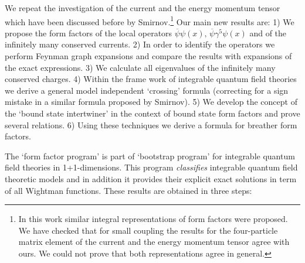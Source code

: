 \documentclass[a4paper,a4paper]{article}
\begin{document}
We repeat the investigation of the current and the energy momentum tensor
which have been discussed before by Smirnov\cite{Sm}.\footnote{%
In this work similar integral representations of form factors were proposed.
We have checked that for small coupling the results for the four-particle
matrix element of the current and the energy momentum tensor agree with
ours. We could not prove that both representations agree in general.} Our
main new results are: 1) We propose the form factors of the local operators $%
\overline{\psi }\psi (x),\,\overline{\psi }\gamma ^{5}\psi (x)$ and of the
infinitely many conserved currents. 2) In order to identify the operators we
perform Feynman graph expansions and compare the results with expansions of
the exact expressions. 3) We calculate all eigenvalues of the infinitely
many conserved charges. 4) Within the frame work of integrable quantum field
theories we derive a general model independent `crossing' formula
(correcting for a sign mistake in a similar formula proposed by Smirnov\cite
{Sm}). 5) We develop the concept of the `bound state intertwiner' in the
context of bound state form factors and prove several relations. 6) Using
these techniques we derive a formula for breather form factors.

The `form factor program' is part of `bootstrap program' for integrable
quantum field theories in 1+1-dimensions. This program \emph{classifies}
integrable quantum field theoretic models and in addition it provides their
explicit exact solutions in term of all Wightman functions. These results
are obtained in three steps:
\end{document}

